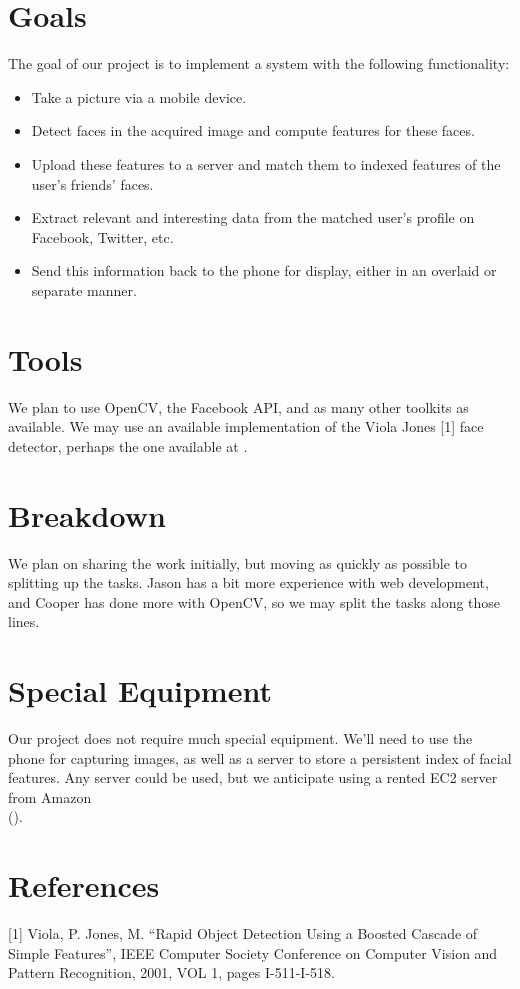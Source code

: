 \section{Goals}

The goal of our project is to implement a system with the following
functionality:

\begin{itemize}
\item Take a picture via a mobile device.
\item Detect faces in the acquired image and compute features for
  these faces.
\item Upload these features to a server and match them to indexed
  features of the user's friends' faces.
\item Extract relevant and interesting data from the matched user's
  profile on Facebook, Twitter, etc.
\item Send this information back to the phone for display, either in
  an overlaid or separate manner.
\end{itemize}



\section{Tools}

We plan to use OpenCV, the Facebook API, and as many other toolkits as
available.  We may use an available implementation of the Viola Jones
[1] face detector, perhaps the one available at
.



\section{Breakdown}

We plan on sharing the work initially, but moving as quickly as
possible to splitting up the tasks.  Jason has a bit more experience
with web development, and Cooper has done more with OpenCV, so we may
split the tasks along those lines.



\section{Special Equipment}

Our project does not require much special equipment.  We'll need to
use the phone for capturing images, as well as a server to store a
persistent index of facial features.  Any server could be used, but we
anticipate using a rented EC2 server from Amazon\\
().



\section{References}

[1] Viola, P. Jones, M.  ``Rapid Object Detection Using a Boosted
Cascade of Simple Features'', IEEE Computer Society Conference on
Computer Vision and Pattern Recognition, 2001, VOL 1, pages
I-511-I-518.

